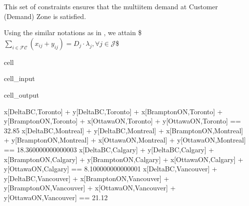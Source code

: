 \documentclass[letterpaper,10pt,english]{jupyterBook}
\begin{document}
\sphinxAtStartPar
This set of constraints ensures that the multi\sphinxhyphen{}item demand at Customer (Demand) Zone  is satisfied.

\sphinxAtStartPar
Using the similar notations as in , we attain
\$\(\sum_{i \in \mathcal{FC}}  \left( x_{ij} + y_{ij} \right) = D_j \cdot \lambda_j, \forall j\in \mathcal{J} \)\$

\begin{sphinxuseclass}{cell}\begin{sphinxVerbatimInput}

\begin{sphinxuseclass}{cell_input}
\begin{sphinxVerbatim}[commandchars=\\\{\}]

   
    \PYG{p}{[}\PYG{p}{]}  \PYG{p}{[}\PYG{p}{]}      \PYG{p}{[}\PYG{p}{]}\PYG{p}{[}\PYG{p}{]}
    
\end{sphinxVerbatim}

\end{sphinxuseclass}\end{sphinxVerbatimInput}
\begin{sphinxVerbatimOutput}

\begin{sphinxuseclass}{cell_output}
\begin{sphinxVerbatim}[commandchars=\\\{\}]
x[Delta\PYGZhy{}BC,Toronto] + y[Delta\PYGZhy{}BC,Toronto] + x[Brampton\PYGZhy{}ON,Toronto] + y[Brampton\PYGZhy{}ON,Toronto] + x[Ottawa\PYGZhy{}ON,Toronto] + y[Ottawa\PYGZhy{}ON,Toronto]  ==  32.85
x[Delta\PYGZhy{}BC,Montreal] + y[Delta\PYGZhy{}BC,Montreal] + x[Brampton\PYGZhy{}ON,Montreal] + y[Brampton\PYGZhy{}ON,Montreal] + x[Ottawa\PYGZhy{}ON,Montreal] + y[Ottawa\PYGZhy{}ON,Montreal]  ==  18.360000000000003
x[Delta\PYGZhy{}BC,Calgary] + y[Delta\PYGZhy{}BC,Calgary] + x[Brampton\PYGZhy{}ON,Calgary] + y[Brampton\PYGZhy{}ON,Calgary] + x[Ottawa\PYGZhy{}ON,Calgary] + y[Ottawa\PYGZhy{}ON,Calgary]  ==  8.100000000000001
x[Delta\PYGZhy{}BC,Vancouver] + y[Delta\PYGZhy{}BC,Vancouver] + x[Brampton\PYGZhy{}ON,Vancouver] + y[Brampton\PYGZhy{}ON,Vancouver] + x[Ottawa\PYGZhy{}ON,Vancouver] + y[Ottawa\PYGZhy{}ON,Vancouver]  ==  21.12
\end{sphinxVerbatim}


\end{sphinxuseclass}
\end{sphinxVerbatimOutput}
\end{sphinxuseclass}
\end{document}
